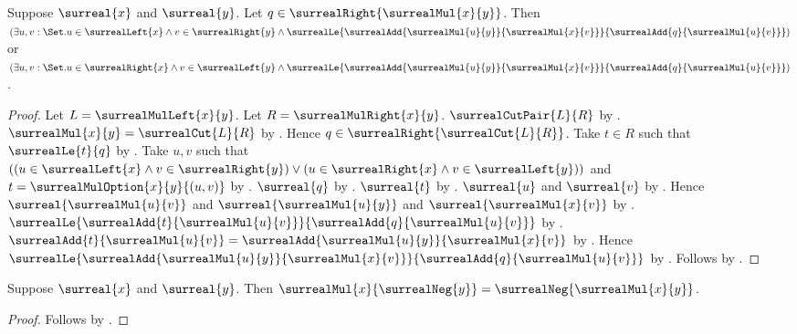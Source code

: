 \begin{theorem}\label{surreal_mul_right_interpolation}
    Suppose $\surreal{x}$ and $\surreal{y}$.
    Let $q\in\surrealRight{\surrealMul{x}{y}}$.
    Then
        $(\exists u,v:\Set.
            u\in\surrealLeft{x}\land v\in\surrealRight{y}\land
            \surrealLe{
                \surrealAdd{\surrealMul{u}{y}}{\surrealMul{x}{v}}}{
                \surrealAdd{q}{\surrealMul{u}{v}}})$
        or
        $(\exists u,v:\Set.
            u\in\surrealRight{x}\land v\in\surrealLeft{y}\land
            \surrealLe{
                \surrealAdd{\surrealMul{u}{y}}{\surrealMul{x}{v}}}{
                \surrealAdd{q}{\surrealMul{u}{v}}})$.
\end{theorem}
\begin{proof}
    Let $L=\surrealMulLeft{x}{y}$.
    Let $R=\surrealMulRight{x}{y}$.
    $\surrealCutPair{L}{R}$ by .
    $\surrealMul{x}{y}=\surrealCut{L}{R}$
        by .
    Hence $q\in\surrealRight{\surrealCut{L}{R}}$.
    Take $t\in R$ such that $\surrealLe{t}{q}$
        by .
    Take $u,v$ such that
        $((u\in\surrealLeft{x}\land v\in\surrealRight{y})
          \lor(u\in\surrealRight{x}\land v\in\surrealLeft{y}))$
        and $t=\surrealMulOption{x}{y}{(u,v)}$
        by .
    $\surreal{q}$ by
        .
    $\surreal{t}$ by .
    $\surreal{u}$ and $\surreal{v}$
        by .
    Hence $\surreal{\surrealMul{u}{v}}$ and
        $\surreal{\surrealMul{u}{y}}$ and
        $\surreal{\surrealMul{x}{v}}$
        by .
    $\surrealLe{
        \surrealAdd{t}{\surrealMul{u}{v}}}{
        \surrealAdd{q}{\surrealMul{u}{v}}}$
        by .
    $\surrealAdd{t}{\surrealMul{u}{v}}
        =\surrealAdd{\surrealMul{u}{y}}{\surrealMul{x}{v}}$
        by .
    Hence $\surrealLe{
        \surrealAdd{\surrealMul{u}{y}}{\surrealMul{x}{v}}}{
        \surrealAdd{q}{\surrealMul{u}{v}}}$
        by \auto.
    Follows by \auto.
\end{proof}

\begin{corollary}\label{surreal_mul_neg_right}
    Suppose $\surreal{x}$ and $\surreal{y}$.
    Then $\surrealMul{x}{\surrealNeg{y}}
        =\surrealNeg{\surrealMul{x}{y}}$.
\end{corollary}
\begin{proof}
    Follows by
        .
\end{proof}

